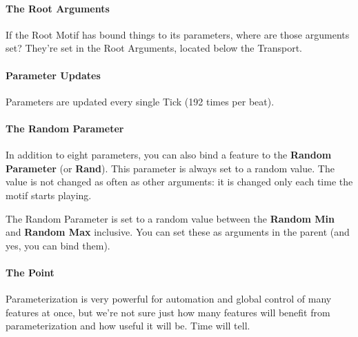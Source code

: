 \documentclass[twoside,10pt]{article}
\begin{document}
\paragraph{The Root Arguments}  If the Root Motif has bound things to its parameters, where are those arguments set?  They're set in the Root Arguments, located below the Transport.

\paragraph{Parameter Updates}  Parameters are updated every single Tick (192 times per beat).

\paragraph{The Random Parameter}  In addition to eight parameters, you can also bind a feature to the {\bf Random Parameter} (or {\bf Rand}).  This parameter is always set to a random value.  The value is not changed as often as other arguments: it is changed only each time the motif starts playing.

The Random Parameter is set to a random value between the {\bf Random Min} and {\bf Random Max} inclusive.  You can set these as arguments in the parent (and yes, you can bind them).  

\paragraph{The Point}  Parameterization is very powerful for automation and global control of many features at once, but we're not sure just how many features will benefit from parameterization and how useful it will be.    Time will tell.
\end{document}
